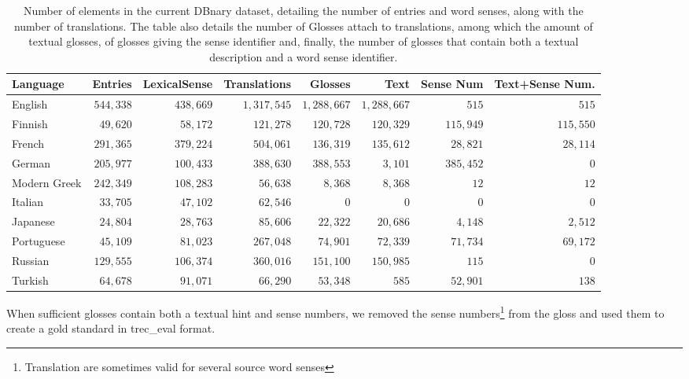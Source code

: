 \documentclass[10pt, a4paper]{article}
\begin{document}
\begin{table}[htb]
\begin{center}\begin{footnotesize}
\begin{tabular}{lrrrrrrr}
\textbf{Language} & \textbf{Entries} & \textbf{LexicalSense} & \textbf{Translations} & \textbf{Glosses} & \textbf{Text} &  \textbf{Sense Num} & \textbf{Text+Sense Num.}\\
\hline
English & $544,338$ & $438,669$ & $1,317,545$ & $1,288,667$ & $1,288,667$ & $515$ & $515$ \\
Finnish & $49,620$ & $58,172$ & $121,278$ & $120,728$ & $120,329$ & $115,949$ & $115,550$ \\
French & $291,365$ & $379,224$ & $504,061$ & $136,319$ & $135,612$ & $28,821$ & $28,114$ \\
German & $205,977$ & $100,433$ & $388,630$ & $388,553$ & $3,101$ & $385,452$ & $0$ \\
Modern Greek & $242,349$ & $108,283$ & $56,638$ & $8,368$ & $8,368$ & $12$ & $12$ \\
Italian & $33,705$ & $47,102$ & $62,546$ & $0$ & $0$ & $0$ & $0$ \\
Japanese & $24,804$ & $28,763$ & $85,606$ & $22,322$ & $20,686$ & $4,148$ & $2,512$ \\
Portuguese & $45,109$ & $81,023$ & $267,048$ & $74,901$ & $72,339$ & $71,734$ & $69,172$ \\
Russian & $129,555$ & $106,374$ & $360,016$ & $151,100$ & $150,985$ & $115$ & $0$ \\
Turkish & $64,678$ & $91,071$ & $66,290$ & $53,348$ & $585$ & $52,901$ & $138$ \\
\hline
\end{tabular}
\caption{Number of elements in the current DBnary dataset, detailing the number of entries and word senses, along with the number of translations. The table also details the number of Glosses attach to translations, among which the amount of textual glosses, of glosses giving the sense identifier and, finally, the number of glosses that contain both a textual description and a word sense identifier.}
\label{lemon-elts}
\end{footnotesize}\end{center}
\end{table}

When sufficient glosses contain both a textual hint and sense numbers, we removed the sense numbers\footnote{Translation are sometimes valid for several source word senses} from the gloss and used them to create a gold standard in trec\_eval format.
\end{document}
